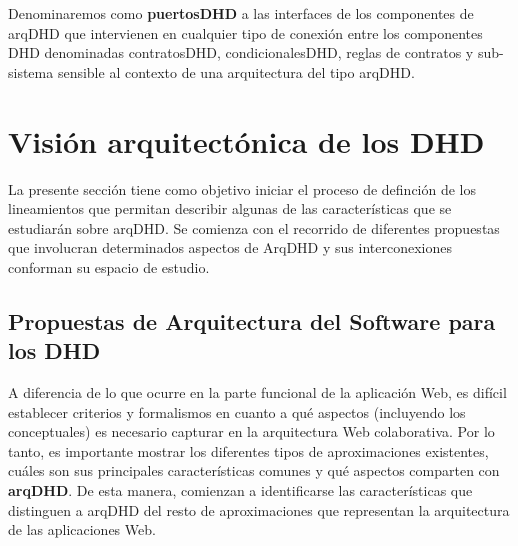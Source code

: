 \begin{defi}
Denominaremos como \textbf{puertosDHD} a las interfaces de los componentes de arqDHD que intervienen en cualquier tipo de conexión entre los componentes DHD denominadas contratosDHD, condicionalesDHD, reglas de contratos y sub-sistema sensible al contexto de una arquitectura del tipo arqDHD.
\end{defi}



\section{Visión arquitectónica de los DHD}

La presente sección tiene como objetivo iniciar el proceso de definción de los lineamientos que permitan describir algunas de las
características que se estudiarán sobre arqDHD. Se comienza con el
recorrido de diferentes propuestas que involucran determinados aspectos de
ArqDHD y sus interconexiones conforman su espacio de estudio.

\subsection {Propuestas de Arquitectura del Software para los DHD}

A diferencia de lo que ocurre en la parte funcional de la aplicación Web, es
difícil establecer criterios y formalismos en cuanto a qué aspectos
(incluyendo los conceptuales) es necesario capturar en la arquitectura Web
colaborativa. Por lo tanto, es importante mostrar los diferentes tipos de
aproximaciones existentes, cuáles son sus principales características comunes y
qué aspectos comparten con \textbf{arqDHD}. De esta manera, comienzan a identificarse las características que distinguen a arqDHD del resto de aproximaciones que representan la arquitectura de las aplicaciones Web.

